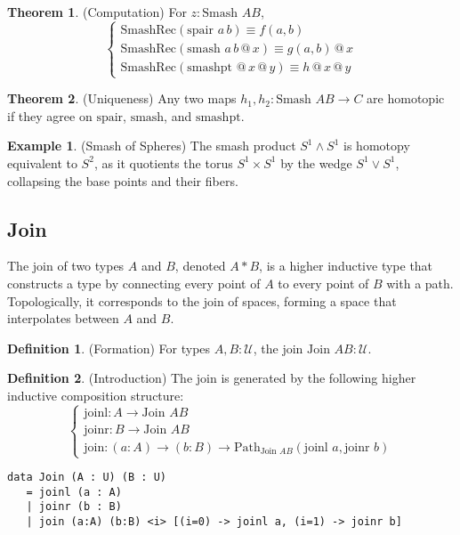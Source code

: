 \documentclass{article}
\theoremstyle{definition}
\newtheorem{theorem}{Theorem}
\newtheorem{definition}{Definition}
\newtheorem{example}{Example}
\begin{document}
\begin{theorem} (Computation)
For $z : \text{Smash } A B$,
\[
\begin{cases}
\text{SmashRec}(\text{spair } a \, b) \equiv f(a, b) \\
\text{SmashRec}(\text{smash } a \, b \, @ \, x) \equiv g(a, b) \, @ \, x \\
\text{SmashRec}(\text{smashpt } @ \, x \, @ \, y) \equiv h \, @ \, x \, @ \, y
\end{cases}
\]
\end{theorem}

\begin{theorem} (Uniqueness)
Any two maps $h_1, h_2 : \text{Smash } A B \to C$ are homotopic
if they agree on $\text{spair}$, $\text{smash}$, and $\text{smashpt}$.
\end{theorem}

\begin{example} (Smash of Spheres)
The smash product $S^1 \wedge S^1$ is homotopy equivalent to $S^2$,
as it quotients the torus $S^1 \times S^1$ by the wedge $S^1 \vee S^1$,
collapsing the base points and their fibers.
\end{example}

\newpage
\subsection{Join}
The join of two types $A$ and $B$, denoted $A * B$,
is a higher inductive type that constructs a type by
connecting every point of $A$ to every point of $B$ with a path.
Topologically, it corresponds to the join of spaces, forming a
space that interpolates between $A$ and $B$.

\begin{definition} (Formation)
For types $A, B : \mathcal{U}$, the join $\text{Join } A B : \mathcal{U}$.
\end{definition}

\begin{definition} (Introduction)
The join is generated by the following higher inductive composition structure:
\[
\begin{cases}
\text{joinl} : A \to \text{Join } A B \\
\text{joinr} : B \to \text{Join } A B \\
\text{join} : (a : A) \to (b : B) \to \text{Path}_{\text{Join } A B} (\text{joinl } a, \text{joinr } b)
\end{cases}
\]
\begin{lstlisting}
data Join (A : U) (B : U)
   = joinl (a : A)
   | joinr (b : B)
   | join (a:A) (b:B) <i> [(i=0) -> joinl a, (i=1) -> joinr b]
\end{lstlisting}
\end{definition}
\end{document}
